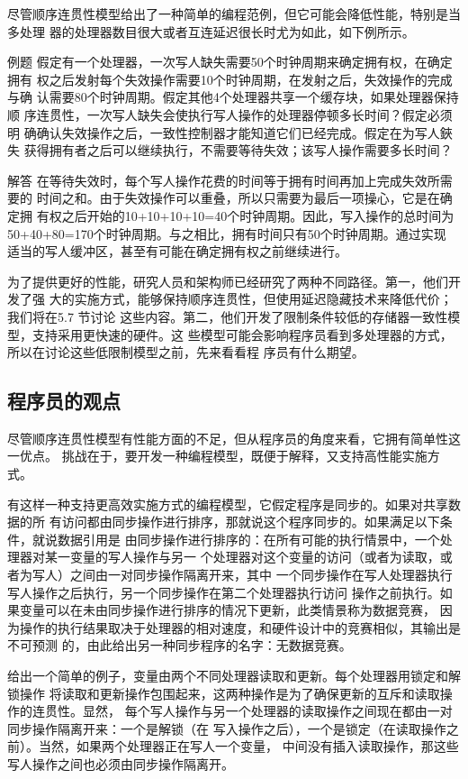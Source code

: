 尽管顺序连贯性模型给出了一种简单的编程范例，但它可能会降低性能，特别是当多处理
器的处理器数目很大或者互连延迟很长时尤为如此，如下例所示。

例题
假定有一个处理器，一次写人缺失需要50个时钟周期来确定拥有权，在确定拥有
权之后发射每个失效操作需要10个时钟周期，在发射之后，失效操作的完成与确
认需要80个时钟周期。假定其他4个处理器共享一个缓存块，如果处理器保持顺
序连贯性，一次写人缺失会使执行写人操作的处理器停顿多长时间？假定必须明
确确认失效操作之后，一致性控制器才能知道它们已经完成。假定在为写人鋏失
获得拥有者之后可以继续执行，不需要等待失效；该写人操作需要多长时间？

解答
在等待失效时，每个写人操作花费的时间等于拥有时间再加上完成失效所需要的
时间之和。由于失效操作可以重叠，所以只需要为最后一项操心，它是在确定拥
有权之后开始的10+10+10+10=40个时钟周期。因此，写入操作的总时间为
50+40+80=170个时钟周期。与之相比，拥有时间只有50个时钟周期。通过实现
适当的写人缓冲区，甚至有可能在确定拥有权之前继续进行。

为了提供更好的性能，研究人员和架构师已经研究了两种不同路径。第一，他们开发了强
大的实施方式，能够保持顺序连贯性，但使用延迟隐藏技术来降低代价；我们将在5.7 节讨论
这些内容。第二，他们开发了限制条件较低的存储器一致性模型，支持采用更快速的硬件。这
些模型可能会影响程序员看到多处理器的方式，所以在讨论这些低限制模型之前，先来看看程
序员有什么期望。

\subsection{程序员的观点}
尽管顺序连贯性模型有性能方面的不足，但从程序员的角度来看，它拥有简单性这一优点。
挑战在于，要开发一种编程模型，既便于解释，又支持高性能实施方式。

有这样一种支持更高效实施方式的编程模型，它假定程序是同步的。如果对共享数据的所
有访问都由同步操作进行排序，那就说这个程序同步的。如果满足以下条件，就说数据引用是
由同步操作进行排序的：在所有可能的执行情景中，一个处理器对某一变量的写人操作与另一
个处理器对这个变量的访问（或者为读取，或者为写人）之间由一对同步操作隔离开来，其中
一个同步操作在写人处理器执行写人操作之后执行，另一个同步操作在第二个处理器执行访问
操作之前执行。如果变量可以在未由同步操作进行排序的情况下更新，此类情景称为数据竞赛，
因为操作的执行结果取决于处理器的相对速度，和硬件设计中的竞赛相似，其输出是不可预测
的，由此给出另一种同步程序的名字：无数据竞赛。

给出一个简单的例子，变量由两个不同处理器读取和更新。每个处理器用锁定和解锁操作
将读取和更新操作包围起来，这两种操作是为了确保更新的互斥和读取操作的连贯性。显然，
每个写人操作与另一个处理器的读取操作之间现在都由一对同步操作隔离开来：一个是解锁（在
写入操作之后），一个是锁定（在读取操作之前）。当然，如果两个处理器正在写人一个变量，
中间没有插入读取操作，那这些写人操作之间也必须由同步操作隔离开。

